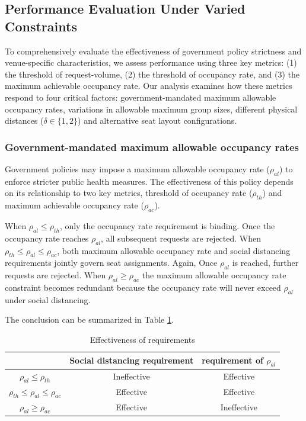 \subsection{Performance Evaluation Under Varied Constraints}\label{perf_constraints}
To comprehensively evaluate the effectiveness of government policy strictness and venue-specific characteristics, we assess performance using three key metrics: (1) the threshold of request-volume, (2) the threshold of occupancy rate, and (3) the maximum achievable occupancy rate. Our analysis examines how these metrics respond to four critical factors: government-mandated maximum allowable occupancy rates, variations in allowable maximum group sizes, different physical distances ($\delta \in \{1,2\}$) and alternative seat layout configurations.


\subsubsection{Government-mandated maximum allowable occupancy rates}

Government policies may impose a maximum allowable occupancy rate ($\rho_{al}$) to enforce stricter public health measures. The effectiveness of this policy depends on its relationship to two key metrics, threshold of occupancy rate ($\rho_{th}$) and maximum achievable occupancy rate ($\rho_{ac}$).

When $\rho_{al} \leq \rho_{th}$, only the occupancy rate requirement is binding. Once the occupancy rate reaches $\rho_{al}$, all subsequent requests are rejected. When $\rho_{th} \leq \rho_{al} \leq \rho_{ac}$, both maximum allowable occupancy rate and social distancing requirements jointly govern seat assignments. Again, Once $\rho_{al}$ is reached, further requests are rejected. When $\rho_{al} \geq \rho_{ac}$ the maximum allowable occupancy rate constraint becomes redundant because the occupancy rate will never exceed $\rho_{al}$ under social distancing.


The conclusion can be summarized in Table \ref{tab_requirement}.
\begin{table}[ht]
  \centering
  \caption{Effectiveness of requirements}\label{tab_requirement}
  \begin{tabular}{ccc}
  \hline
   & Social distancing requirement & requirement of $\rho_{al}$ \\
  \hline
  $\rho_{al} \leq \rho_{th}$            & Ineffective & Effective \\
  $\rho_{th} \leq \rho_{al} \leq \rho_{ac}$  & Effective   & Effective \\
  $\rho_{al} \geq \rho_{ac}$                  & Effective   & Ineffective \\
   \hline
  \end{tabular}
\end{table}


